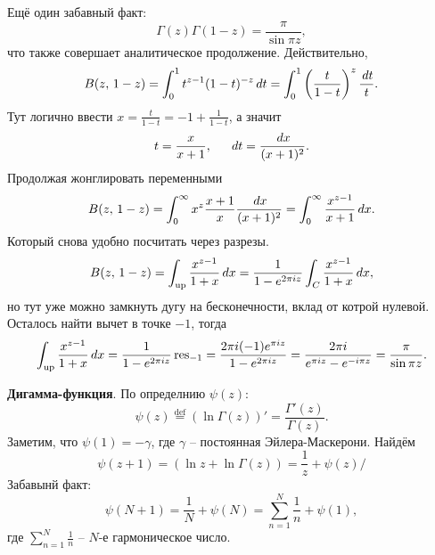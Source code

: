 Ещё один забавный факт:
\begin{equation*}
    \Gamma(z) \Gamma(1-z) = \frac{\pi}{\sin \pi z},
\end{equation*}
что также совершает аналитическое продолжение. Действительно,
\begin{equation*}
    B(z,\, 1-z) = \int_{0}^{1}  t^{z-1} (1-t)^{-z} \, d t = \int_0^1 \left(\frac{t}{1-t}\right)^z \frac{\, d t}{t}.
\end{equation*}
Тут логично ввести $x = \frac{t}{1-t} = -1 + \frac{1}{1-t}$, а значит
\begin{equation*}
    t = \frac{x}{x+1}, \hspace{5 mm} 
    \, d t = \frac{\, d x}{(x+1)^2}.
\end{equation*}
Продолжая жонглировать переменными
\begin{equation*}
    B(z,\, 1-z) = \int_{0}^{\infty} x^z \frac{x+1}{x} \frac{\, d x}{(x + 1)^2} = 
    \int_{0}^{\infty} \frac{x^{z-1}}{x+1} \, d x.
\end{equation*}
Который снова удобно посчитать через разрезы. 
\begin{equation*}
    B(z,\, 1-z) = \int_{\text{up}} \frac{x^{z-1}}{1+x} \, d x =
    \frac{1}{1-e^{2 \pi i z}} \int_C \frac{x^{z-1}}{1+x} \, d x,
\end{equation*}
но тут уже можно замкнуть дугу на бесконечности, вклад от котрой нулевой.  Осталось найти вычет в точке $-1$, тогда
\begin{equation*}
    \int_{\text{up}} \frac{x^{z-1}}{1+x} \, d x = \frac{1}{1-e^{2\pi i z}}    \mathop{\mathrm{res}}\nolimits_{-1} = \frac{2 \pi i (-1) e^{\pi i z}}{1 - e^{2 \pi i z}} = \frac{2 \pi i}{e^{\pi i z} - e^{-i \pi z}} = \frac{\pi}{\sin \pi z}.
\end{equation*}

\textbf{Дигамма-функция}. По определнию $\psi(z)$:
\begin{equation*}
    \psi(z) \overset{\mathrm{def}}{=}  \left(\ln \Gamma(z)\right)' = \frac{\Gamma'(z)}{\Gamma(z)}.
\end{equation*}
Заметим, что $\psi(1) = - \gamma$, где $\gamma$ -- постоянная Эйлера-Маскерони. Найдём
\begin{equation*}
    \psi(z+1)= \left(\ln z + \ln \Gamma(z)\right) = \frac{1}{z} + \psi(z)/
\end{equation*}
Забавынй факт:
\begin{equation*}
    \psi(N+1) = \frac{1}{N} + \psi(N) = \sum_{n=1}^{N} \frac{1}{n} + \psi(1),
\end{equation*}
где $\sum_{n=1}^{N} \frac{1}{n}$ -- $N$-е гармоническое число. 


